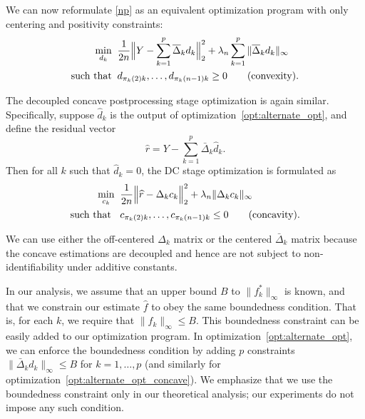 We can now reformulate \eqref{np} as an equivalent optimization program with only centering and positivity constraints:
\begin{align}
\min_{d_k}\;\; & \frac{1}{2n} 
       \Bigl\| Y - \sum_{k=1}^p 
              \overline{\Delta}_k d_k \Bigr\|_2^2 
               + \lambda_n \sum_{k=1}^p \|\overline{\Delta}_k d_k \|_\infty   
     \label{opt:alternate_opt} \\
\textrm{such that}\;\;  & d_{\pi_k(2)k}, \ldots , d_{\pi_k(n-1)k} \geq 0  	
               \qquad \textrm{(convexity).} \nonumber 
\end{align}

The decoupled concave postprocessing stage optimization is again
similar. Specifically, suppose $\hat{d}_k$ is the output of
optimization~\eqref{opt:alternate_opt}, and define the residual vector
\begin{equation}
\hat{r} = Y -
\sum_{k=1}^p \bar{\Delta}_k \hat{d}_k.
\label{eq:residual}
\end{equation}  
Then  for all $k$ such that $\hat{d}_k = 0$, the DC stage optimization is
formulated as
\begin{align}
  \min_{c_k}\;\; & 
      \frac{1}{2n} \Bigl \| \widehat{r} - \Delta_k c_k \Bigr \|_2^2
      + \lambda_n \| \Delta_k c_k \|_\infty 
      \label{opt:alternate_opt_concave}\\
 \textrm{such that }\;\; & c_{\pi_k(2)k}, \ldots, c_{\pi_k(n-1)k} \leq 0 \qquad \textrm{(concavity).} \nonumber
\end{align}

We can use either the off-centered $\Delta_k$ matrix or the centered
$\bar{\Delta}_k$ matrix because the concave estimations are decoupled
and hence are not subject to non-identifiability under additive constants.

\begin{remark}
  In our analysis, we assume that an upper bound $B$ to
  $\| f^*_k \|_\infty$ is known, and that we constrain our estimate
  $\hat{f}$ to obey the same boundedness condition.  That is, for each
  $k$, we require that $\|\hat{f}_k\|_\infty \leq B$. This boundedness
  constraint can be easily added to our optimization program. In
  optimization~\eqref{opt:alternate_opt}, we can enforce the boundedness
  condition by adding $p$ constraints $\| \bar{\Delta}_k d_k
  \|_\infty \leq B$ for $k=1,\ldots,p$ (and similarly for
  optimization~\eqref{opt:alternate_opt_concave}). We emphasize that we
  use the boundedness constraint only in our theoretical analysis; 
  our experiments do not impose any such condition.
\end{remark}



